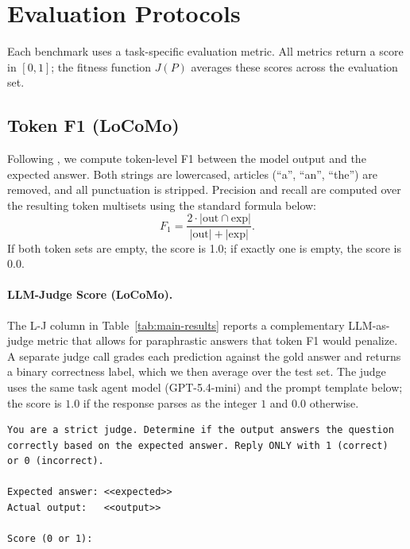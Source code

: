 \FloatBarrier


\section{Evaluation Protocols}
\label{app:eval-protocols}

Each benchmark uses a task-specific evaluation metric.
All metrics return a score in $[0, 1]$; the fitness function $J(P)$ averages these scores across the evaluation set.

\subsection{Token F1 (LoCoMo)}
\label{app:metric-token-f1}

Following \citet{squad}, we compute token-level F1 between the model output and the expected answer.
Both strings are lowercased, articles (``a'', ``an'', ``the'') are removed, and all punctuation is stripped.
Precision and recall are computed over the resulting token multisets using the standard formula below:
\begin{equation}
F_1 = \frac{2 \cdot |\text{out} \cap \text{exp}|}{|\text{out}| + |\text{exp}|}.
\end{equation}
If both token sets are empty, the score is 1.0; if exactly one is empty, the score is 0.0.

\paragraph{LLM-Judge Score (LoCoMo).}
The L-J column in Table~\ref{tab:main-results} reports a complementary LLM-as-judge metric that allows for paraphrastic answers that token F1 would penalize.
A separate judge call grades each prediction against the gold answer and returns a binary correctness label, which we then average over the test set.
The judge uses the same task agent model (GPT-5.4-mini) and the prompt template below; the score is $1.0$ if the response parses as the integer $1$ and $0.0$ otherwise.
\begin{lstlisting}[style=evolvedcode, basicstyle=\ttfamily\scriptsize]
You are a strict judge. Determine if the output answers the question
correctly based on the expected answer. Reply ONLY with 1 (correct)
or 0 (incorrect).

Expected answer: <<expected>>
Actual output:   <<output>>

Score (0 or 1):
\end{lstlisting}

